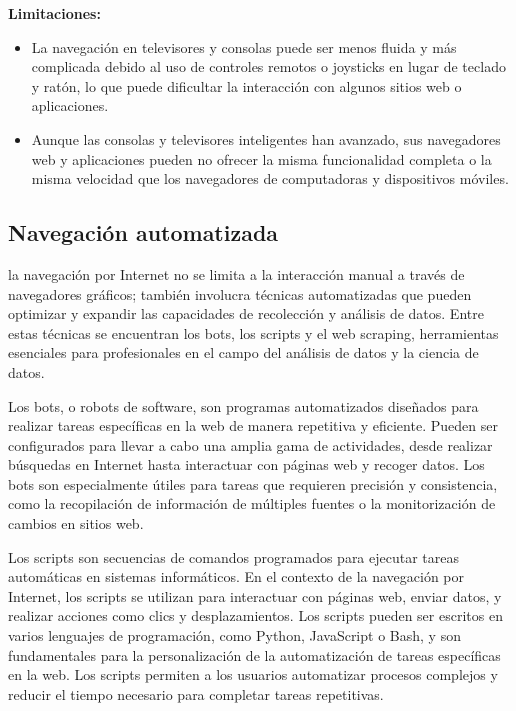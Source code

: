 \documentclass[12pt]{article}
\begin{document}
                        \textbf{Limitaciones:}

                        \begin{itemize}
                                \item La navegación en televisores y consolas puede ser menos fluida y más complicada debido al uso de controles remotos o joysticks en lugar de teclado y ratón, lo que puede dificultar la interacción con algunos sitios web o aplicaciones.
                                \item Aunque las consolas y televisores inteligentes han avanzado, sus navegadores web y aplicaciones pueden no ofrecer la misma funcionalidad completa o la misma velocidad que los navegadores de computadoras y dispositivos móviles.
                        \end{itemize}

                \subsection{Navegación automatizada}

                la navegación por Internet no se limita a la interacción manual a través de navegadores gráficos; también involucra técnicas automatizadas que pueden optimizar y expandir las capacidades de recolección y análisis de datos. Entre estas técnicas se encuentran los bots, los scripts y el web scraping, herramientas esenciales para profesionales en el campo del análisis de datos y la ciencia de datos. 

                Los bots, o robots de software, son programas automatizados diseñados para realizar tareas específicas en la web de manera repetitiva y eficiente. Pueden ser configurados para llevar a cabo una amplia gama de actividades, desde realizar búsquedas en Internet hasta interactuar con páginas web y recoger datos. Los bots son especialmente útiles para tareas que requieren precisión y consistencia, como la recopilación de información de múltiples fuentes o la monitorización de cambios en sitios web.

                Los scripts son secuencias de comandos programados para ejecutar tareas automáticas en sistemas informáticos. En el contexto de la navegación por Internet, los scripts se utilizan para interactuar con páginas web, enviar datos, y realizar acciones como clics y desplazamientos. Los scripts pueden ser escritos en varios lenguajes de programación, como Python, JavaScript o Bash, y son fundamentales para la personalización de la automatización de tareas específicas en la web. Los scripts permiten a los usuarios automatizar procesos complejos y reducir el tiempo necesario para completar tareas repetitivas.
\end{document}
